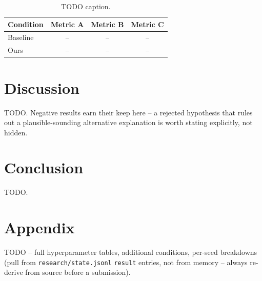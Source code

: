 \documentclass{article} %
\begin{document}
\begin{table}[h]
\centering
\caption{TODO caption.}
\label{tab:headline}
\begin{tabular}{lccc}
\toprule
Condition & Metric A & Metric B & Metric C \\
\midrule
Baseline & -- & -- & -- \\
Ours & -- & -- & -- \\
\bottomrule
\end{tabular}
\end{table}

\section{Discussion}
TODO. Negative results earn their keep here -- a rejected hypothesis that
rules out a plausible-sounding alternative explanation is worth stating
explicitly, not hidden.

\section{Conclusion}
TODO.




\appendix
\section{Appendix}
TODO -- full hyperparameter tables, additional conditions, per-seed
breakdowns (pull from \texttt{research/state.jsonl} \texttt{result} entries,
not from memory -- always re-derive from source before a submission).
\end{document}
